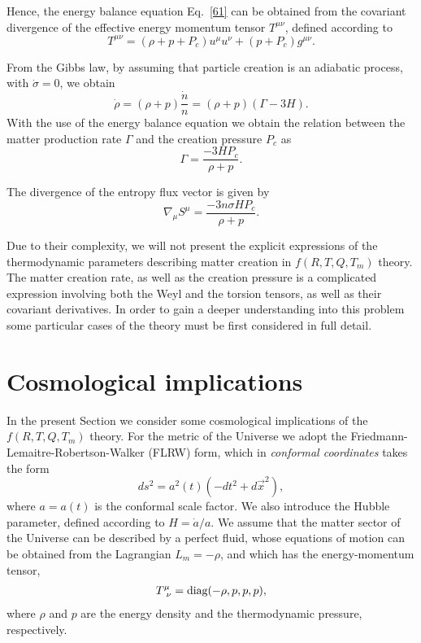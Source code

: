 \documentclass[aps,superscriptaddress, showpacs,preprintnumbers, superscriptaddress, nofootinbibt,twocolumn]{revtex4}
\begin{document}
Hence, the energy balance equation Eq.~\eqref{61} can be obtained from the covariant divergence of the effective energy momentum tensor $%
T^{\mu \nu }$, defined according to
\begin{equation}
T^{\mu \nu }=\left( \rho +p+P_{c}\right) u^{\mu }u^{\nu }+\left(
p+P_{c}\right) g^{\mu \nu }.
\end{equation}

From the Gibbs law, by assuming that particle creation is an adiabatic process, with $\dot{\sigma}=0$, we obtain
\begin{equation}
\dot{\rho}
=\left(\rho+p\right)\frac{\dot{n}}{n}
=\left(\rho+p\right)\left(\Gamma-3H\right).
\end{equation}
With the use of the energy balance equation we obtain the
relation between the matter production rate $\Gamma $ and the creation pressure $P_c$ as
\begin{equation}
\Gamma=\frac{-3HP_c}{\rho+p}.
\end{equation}

The divergence of the entropy flux vector is given by
\begin{equation}
\nabla _{\mu}S^{\mu}=\frac{-3 n \sigma H P_c}{\rho+p}.
\end{equation}

Due to their complexity, we will not present the explicit expressions of the thermodynamic parameters describing matter creation in $f\left(R,T,Q,T_m\right)$ theory. The matter creation rate, as well as the creation pressure is a complicated expression involving both the Weyl and the torsion tensors, as well as their covariant derivatives. In order to gain a deeper understanding into this problem some particular cases of the theory must be first considered in full detail.

\section{Cosmological implications}\label{sect3}

In the present Section we consider some cosmological implications of the $f\left(R,T,Q,T_m\right)$ theory. For the metric of the Universe we adopt the  Friedmann-Lemaitre-Robertson-Walker (FLRW) form, which in {\it conformal coordinates} takes the form
 \begin{equation}
 ds^2=a^2(t)\left(-dt^2+d\vec{x}^2\right),
 \end{equation}
 where $a=a(t)$ is the conformal scale factor. We also introduce the Hubble parameter, defined according to $H=\dot{a}/a$. We assume that the matter sector of the Universe can be described by a perfect fluid, whose equations of motion can be obtained from the Lagrangian $L_m=-\rho$, and which has  the energy-momentum tensor,
 \begin{align}
 T^\mu_{~\nu}=\textmd{diag}(-\rho,p,p,p),
 \end{align}
where $\rho$ and $p$ are the energy density and the thermodynamic pressure, respectively.
\end{document}
